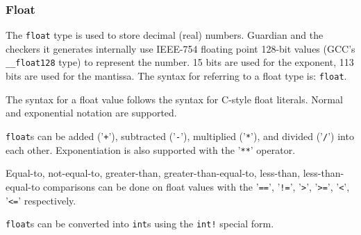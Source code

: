 
\subsubsection{Float}
{
	The \texttt{float} type is used to store decimal (real) numbers.
	Guardian and the checkers it generates internally
	use IEEE-754 floating point
	128-bit values (GCC's \texttt{\_\_float128} type) to represent the number.
	15 bits are used for the exponent, 113 bits are used for the mantissa.
	The syntax for referring to a float type is: \texttt{float}.
	
	The syntax for a float value follows the syntax for C-style float literals.
	Normal and exponential notation are supported.
	
	\texttt{float}s can be added ('\texttt{+}'),
	subtracted ('\texttt{-}'), multiplied ('\texttt{*}'), and
	divided ('\texttt{/}') into each
	other. Exponentiation is also supported
	with the '\texttt{**}' operator.
	
	Equal-to, not-equal-to, greater-than, greater-than-equal-to,
	less-than, less-than-equal-to comparisons can be done on float values with
	the '\texttt{==}', '\texttt{!=}',
	'\texttt{>}', '\texttt{>=}', '\texttt{<}', '\texttt{<=}' respectively.
	
	\texttt{float}s can be converted into \texttt{int}s using
	the \texttt{int!}
	special form.
}
